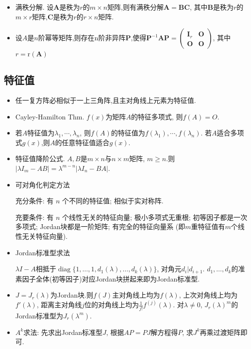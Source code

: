 \documentclass[UTF8]{ctexart}
\begin{document}
\begin{itemize}
\item 满秩分解.
设$\boldsymbol{A}$是秩为$r$的$m\times n$矩阵,则有满秩分解$\boldsymbol{A}=\boldsymbol{B}\boldsymbol{C}$,
其中$\boldsymbol{B}$是秩为$r$的$m\times r$矩阵,$\boldsymbol{C}$是秩为$r$的$r\times n$矩阵.

\item 设$A$是$n$阶幂等矩阵,则存在n阶非异阵$\boldsymbol{P}$,使得$\boldsymbol{P}^{-1} \boldsymbol{A P}=\left(\begin{array}{ll}\boldsymbol{I}_{r} & \boldsymbol{O} \\ \boldsymbol{O} & \boldsymbol{O}\end{array}\right)$,
其中$r=\mathrm{r}(\boldsymbol{A})$ 

\end{itemize}


\subsection{特征值}

\begin{itemize}

\item 任一复方阵必相似于一上三角阵,且主对角线上元素为特征值.

\item Cayley-Hamilton Thm. $f(x)$为矩阵$A$的特征多项式, 则$f(A)=O$.

\item 若$A$特征值为$\lambda_1,\cdots,\lambda_n$, 则$f(A)$的特征值为$f(\lambda_1),\cdots,f(\lambda_n)$.
若$A$适合多项式$g(x)$,则$A$的任意特征值适合$g(x)$.

\item 特征值降阶公式.
$A, B$是$m \times n$与$n \times m$矩阵, $m \geq n$.则
$\left|\lambda I_{m}-A B\right|=\lambda^{m-n}\left|\lambda I_{n}-B A\right|$.

\item 可对角化判定方法\par 
充分条件: 有 $n$ 个不同的特征值; 相似于实对称阵.\par 
充要条件: 有 $n$ 个线性无关的特征向量; 极小多项式无重根;
初等因子都是一次多项式; Jordan块都是一阶矩阵;
有完全的特征向量系 (即$m$重特征值有$m$个线性无关特征向量).

\item Jordan标准型求法\par 
$\lambda I-A$相抵于$\operatorname{diag}\{1,\dots,1,d_1(\lambda),\dots,d_k(\lambda)\}$, 对角元$d_i | d_{i+1}$.
$d_1,\dots,d_k$的准素因子全体(初等因子)对应Jordan块拼起来即为Jordan标准型.

\item $J=J_r(\lambda )$为Jordan块.则$f(J)$主对角线上均为$f(\lambda )$, 上次对角线上均为$f'(\lambda)$,
距离主对角线$j$位的对角线上均为$\frac{1}{j!}f^{(j)}(\lambda)$.
对$\lambda\neq 0$, $J_r(\lambda)^m$的Jordan标准型为$J_r(\lambda^m)$.

\item $A^k$求法: 先求出Jordan标准型$J$, 根据$AP=PJ$解方程得$P$, 求$J^k$再乘过渡矩阵即可.

\end{itemize}
\end{document}

